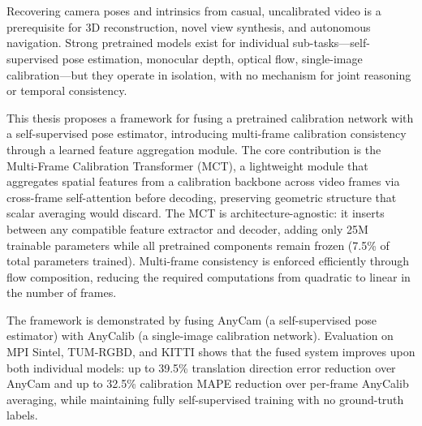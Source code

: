 \chapter{\abstractname}

Recovering camera poses and intrinsics from casual, uncalibrated video is a prerequisite for 3D reconstruction, novel view synthesis, and autonomous navigation. Strong pretrained models exist for individual sub-tasks---self-supervised pose estimation, monocular depth, optical flow, single-image calibration---but they operate in isolation, with no mechanism for joint reasoning or temporal consistency.

This thesis proposes a framework for fusing a pretrained calibration network with a self-supervised pose estimator, introducing multi-frame calibration consistency through a learned feature aggregation module. The core contribution is the Multi-Frame Calibration Transformer (MCT), a lightweight module that aggregates spatial features from a calibration backbone across video frames via cross-frame self-attention before decoding, preserving geometric structure that scalar averaging would discard. The MCT is architecture-agnostic: it inserts between any compatible feature extractor and decoder, adding only 25M trainable parameters while all pretrained components remain frozen (7.5\% of total parameters trained). Multi-frame consistency is enforced efficiently through flow composition, reducing the required computations from quadratic to linear in the number of frames.

The framework is demonstrated by fusing AnyCam (a self-supervised pose estimator) with AnyCalib (a single-image calibration network). Evaluation on MPI Sintel, TUM-RGBD, and KITTI shows that the fused system improves upon both individual models: up to 39.5\% translation direction error reduction over AnyCam and up to 32.5\% calibration MAPE reduction over per-frame AnyCalib averaging, while maintaining fully self-supervised training with no ground-truth labels.
